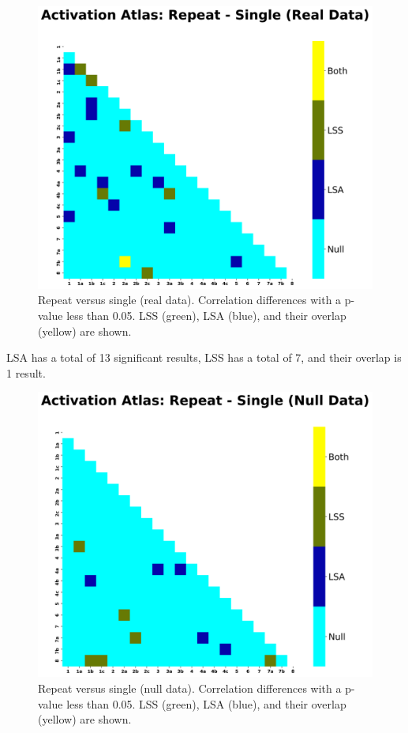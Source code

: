 \documentclass[10pt,letterpaper]{article}
\begin{document}
\begin{figure}[H]
  \centering
  \includegraphics[width=\textwidth]{data-task_atlas-activation_contrast-repeatXsingle}
  \caption{
    Repeat versus single (real data). Correlation differences with a p-value less than 0.05.
    LSS (green), LSA (blue), and their overlap (yellow) are shown.
  }
  \label{fig:repeatvsingle}
\end{figure}

LSA has a total of 13 significant results, LSS has a total of 7,
and their overlap is 1 result.

\begin{figure}[H]
  \centering
  \includegraphics[width=\textwidth]{data-null_atlas-activation_contrast-repeatXsingle}
  \caption{
    Repeat versus single (null data). Correlation differences with a p-value less than 0.05.
    LSS (green), LSA (blue), and their overlap (yellow) are shown.
  }
  \label{fig:restrepeatvsingle}
\end{figure}
\end{document}
